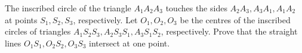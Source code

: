The inscribed circle of the triangle $A_1A_2A_3$ touches the sides $A_2A_3,A_3A_1,A_1A_2$ at points $S_1,S_2,S_3$,  respectively. Let $O_1,O_2,O_3$ be the centres of the inscribed circles of triangles $A_1S_2S_3, A_2S_3S_1,A_3S_1S_2$,  respectively. Prove that the straight lines $O_1S_1,O_2S_2,O_3S_3$ intersect at one point.